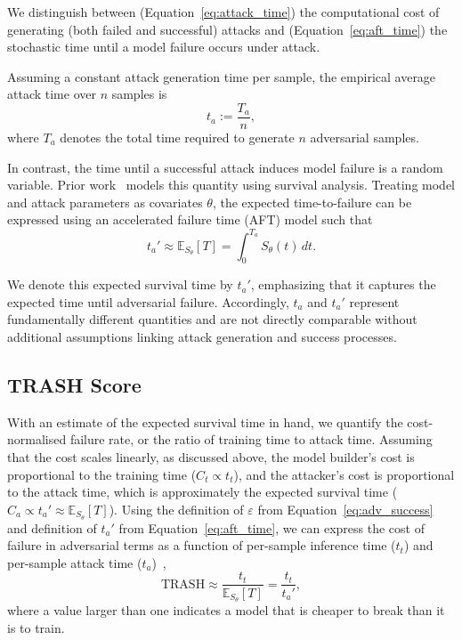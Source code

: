 \documentclass[conference]{IEEEtran}%
\begin{document}
We distinguish between (Equation~\ref{eq:attack_time}) the computational cost of generating (both failed and successful) attacks and 
(Equation~\ref{eq:aft_time}) the stochastic time until a model failure occurs under attack.

Assuming a constant attack generation time per sample, the empirical average 
attack time over $n$ samples is
\begin{equation}
    t_a := \frac{T_a}{n},
    \label{eq:attack_time}
\end{equation}
where $T_a$ denotes the total time required to generate $n$ adversarial samples.

In contrast, the time until a successful attack induces model failure is a 
random variable. 
Prior work~\cite{meyers_aft} models this quantity using 
survival analysis. 
Treating model and attack parameters as covariates $\theta$, 
the expected time-to-failure can be expressed using an accelerated failure time 
(AFT) model such that
\begin{equation}
    t_a' \approx  \mathbb{E}_{S_\theta}[T] = \int_{0}^{T_a} S_{\theta}(t)\, dt.
    \label{eq:aft_time}
\end{equation}

We denote this expected survival time by $t_a'$, emphasizing that it captures 
the expected time until adversarial failure. 
Accordingly, $t_a$ and $t_a'$ 
represent fundamentally different quantities and are not directly comparable 
without additional assumptions linking attack generation and success processes.

\subsection{TRASH Score}
With an estimate of the expected survival time in hand, we quantify the cost-normalised failure rate, or the ratio of training time to attack time. 
Assuming that the cost scales linearly, as discussed above, the model builder's cost is proportional to the training time ($C_t \propto t_{t}$), and the attacker's cost is proportional to the attack time, which is approximately the expected survival time ($C_{a} \propto t_{a}' \approx \mathbb{E}_{S_\theta}[T]$). 
Using the definition of $\varepsilon$ from Equation~\ref{eq:adv_success} and definition of $t_a'$ from Equation~\ref{eq:aft_time}, we can express the cost of failure in adversarial terms as a function of per-sample inference time ($t_t$) and per-sample attack time ($t_a$)~\cite{meyers_aft},
\begin{equation}
	\textrm{TRASH}\approx \frac{t_t}{\mathbb{E}_{S_\theta}[T]} = \frac{t_t}{t_a'},
	\label{eq:cost}
\end{equation}
where a value larger than one indicates a model that is cheaper to break than it is to train.
\end{document}
